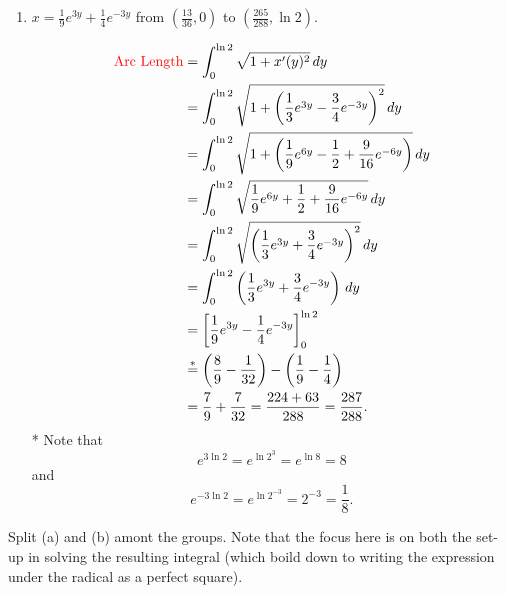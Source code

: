 \documentclass[noinstructornotes]{ximera}
\begin{document}
\begin{problem}
\begin{enumerate}
		\item  $x = \frac{1}{9} e^{3y} + \frac{1}{4} e^{-3y}$ from $\left( \frac{13}{36}, 0 \right)$ to $\left( \frac{265}{288}, \ln 2 \right)$.  
		\begin{freeResponse}
			\begin{align*}
			\text{{\color{red} Arc Length}} &= \int_0^{\ln 2} \sqrt{1+x'(y)^2} \,d y  \\
			&=\int_0^{\ln 2} \sqrt{1+ \left( \frac{1}{3}e^{3y} - \frac{3}{4}e^{-3y} \right)^2} \,d y  \\
			&=  \int_0^{\ln 2} \sqrt{1+ \left( \frac{1}{9}e^{6y} - \frac{1}{2} + \frac{9}{16}e^{-6y} \right)} \,d y  \\
			&= \int_0^{\ln 2} \sqrt{ \frac{1}{9}e^{6y} + \frac{1}{2} + \frac{9}{16}e^{-6y} } \,d y  \\
			&= \int_0^{\ln 2} \sqrt{ \left( \frac{1}{3}e^{3y} + \frac{3}{4}e^{-3y} \right)^2} \,d y  \\
			&= \int_0^{\ln 2} \left( \frac{1}{3}e^{3y} + \frac{3}{4}e^{-3y} \right) \,d y  \\
			&= \bigg[  \frac{1}{9}e^{3y} - \frac{1}{4}e^{-3y} \bigg]_0^{\ln 2}  \\
			&\overset{*}{=} \left( \frac{8}{9} - \frac{1}{32} \right) - \left( \frac{1}{9} - \frac{1}{4} \right)  \\
			&= \frac{7}{9} + \frac{7}{32} = \frac{224 + 63}{288} = \frac{287}{288}.
			\end{align*}
		* Note that
			\[
			e^{3 \ln 2} = e^{\ln 2^3} = e^{\ln 8} = 8
			\]
	and
			\[
			e^{-3 \ln 2} = e^{\ln 2^{-3}} = 2^{-3} = \frac{1}{8}.
			\]
		\end{freeResponse}
		
	\end{enumerate}

\end{problem}

\begin{instructorNotes}
Split (a) and (b) amont the groups.  
Note that the focus here is on both the set-up  in solving the resulting integral (which boild down to writing the expression under the radical as a perfect square).
\end{instructorNotes}


















	
	
	
	
	
	
	
	
	

	










								
				
				
	
\end{document}
